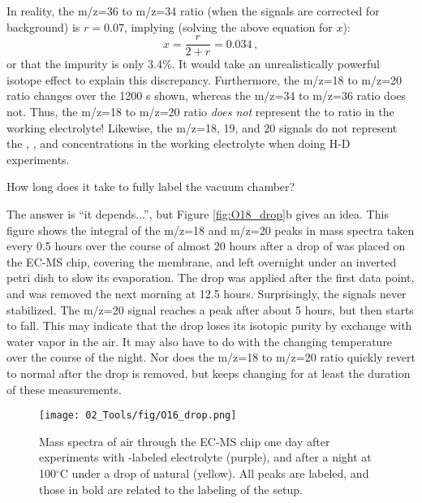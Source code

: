 In reality, the m/z=36 to m/z=34 ratio (when the signals are corrected for background) is $r=0.07$, implying (solving the above equation for $x$):
\begin{equation}
x = \frac{r}{2+r} = 0.034\,,
\end{equation}
or that the  impurity is only 3.4\%. It would take an unrealistically powerful isotope effect to explain this discrepancy. Furthermore, the m/z=18 to m/z=20 ratio changes over the 1200 s shown, whereas the m/z=34 to m/z=36 ratio does not. Thus, the m/z=18 to m/z=20 ratio \textit{does not} represent the  to  ratio in the working electrolyte! Likewise, the m/z=18, 19, and 20 signals do not represent the , , and  concentrations in the working electrolyte when doing H-D experiments.
\begin{question}
How long does it take to fully label the vacuum chamber? 
\end{question}
The answer is ``it depends...'', but Figure \ref{fig:O18_drop}b gives an idea. This figure shows the integral of the m/z=18 and m/z=20 peaks in mass spectra taken every 0.5 hours over the course of almost 20 hours after a drop of  was placed on the EC-MS chip, covering the membrane, and left overnight under an inverted petri dish to slow its evaporation. The drop was applied after the first data point, and was removed the next morning at 12.5 hours. Surprisingly, the signals never stabilized. The m/z=20 signal reaches a peak after about 5 hours, but then starts to fall. This may indicate that the drop loses its isotopic purity by exchange with water vapor in the air. It may also have to do with the changing temperature over the course of the night. Nor does the m/z=18 to m/z=20 ratio quickly revert to normal after the drop is removed, but keeps changing for at least the duration of these measurements.
\begin{figure}[h!]
	\centering
	\texttt{[image: 02\_Tools/fig/O16\_drop.png]}
	\caption{Mass spectra of air through the EC-MS chip one day after experiments with -labeled electrolyte (purple), and after a night at 100$^\circ$C under a drop of natural  (yellow). All peaks are labeled, and those in bold are related to the  labeling of the setup.}
	\label{fig:O16_drop}
\end{figure}

